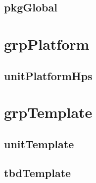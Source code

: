 \documentclass{article}
\begin{document}


\subsection{pkgGlobal}



\section{grpPlatform}

\subsection{unitPlatformHps}



\section{grpTemplate}

\subsection{unitTemplate}



\subsection{tbdTemplate}


\end{document}
